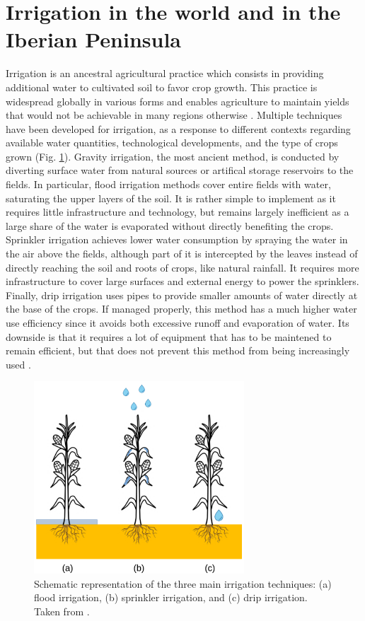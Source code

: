 \section{Irrigation in the world and in the Iberian Peninsula}
Irrigation is an ancestral agricultural practice which consists in providing additional water to cultivated soil to favor crop growth.
This practice is widespread globally in various forms and enables agriculture to maintain yields that would not be achievable in many regions otherwise \citep{siebert_quantifying_2010}.
Multiple techniques have been developed for irrigation, as a response to different contexts regarding available water quantities, technological developments, and the type of crops grown (Fig. \ref{fig:irrig_methods}).
Gravity irrigation, the most ancient method, is conducted by diverting surface water from natural sources or artifical storage reservoirs to the fields. In particular, flood irrigation methods cover entire fields with water, saturating the upper layers of the soil. It is rather simple to implement as it requires little infrastructure and technology, but remains largely inefficient as a large share of the water is evaporated without directly benefiting the crops.
Sprinkler irrigation achieves lower water consumption by spraying the water in the air above the fields, although part of it is intercepted by the leaves instead of directly reaching the soil and roots of crops, like natural rainfall. It requires more infrastructure to cover large surfaces and external energy to power the sprinklers.
Finally, drip irrigation uses pipes to provide smaller amounts of water directly at the base of the crops. If managed properly, this method has a much higher water use efficiency since it avoids both excessive runoff and evaporation of water. Its downside is that it requires a lot of equipment that has to be maintened to remain efficient, but that does not prevent this method from being increasingly used \citep{mpanga_decade_2021}.

\begin{figure}[hbtp]
    \centering
    \includegraphics[width=0.7\textwidth]{images/intro/irrigation_methods_lunel.png}
    \caption{Schematic representation of the three main irrigation techniques: (a) flood irrigation, (b) sprinkler irrigation, and (c) drip irrigation. Taken from \citet{lunel_interactions_2024}.}
    \label{fig:irrig_methods}
\end{figure}

